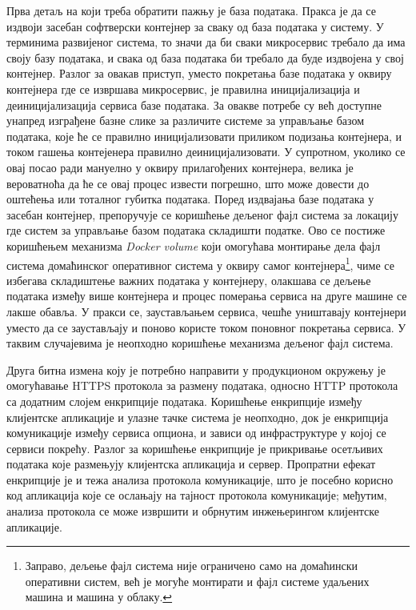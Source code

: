 \documentclass[12pt,oneside]{memoir}
\begin{document}
Прва детаљ на који треба обратити пажњу је база података. Пракса је да се издвоји засебан софтверски контејнер за сваку од база података у систему. У терминима развијеног система, то значи да би сваки микросервис требало да има своју базу података, и свака од база података би требало да буде издвојена у свој контејнер. Разлог за овакав приступ, уместо покретања базе података у оквиру контејнера где се извршава микросервис, је правилна иницијализација и деиницијализација сервиса базе података. За овакве потребе су већ доступне унапред изграђене базне слике за различите системе за управљање базом података, које ће се правилно иницијализовати приликом подизања контејнера, и током гашења контејенера правилно деиницијализовати. У супротном, уколико се овај посао ради мануелно у оквиру прилагођених контејнера, велика је вероватноћа да ће се овај процес извести погрешно, што може довести до оштећења или тоталног губитка података. Поред издвајања базе података у засебан контејнер, препоручује се коришћење дељеног фајл система за локацију где систем за управљање базом података складишти податке. Ово се постиже коришћењем механизма \textit{Docker volume} \cite{dockervolume} који омогућава монтирање дела фајл система домаћинског оперативног система у оквиру самог контејнера\footnote{Заправо, дељење фајл система није ограничено само на домаћински оперативни систем, већ је могуће монтирати и фајл системе удаљених машина и машина у облаку.}, чиме се избегава складиштење важних података у контејнеру, олакшава се дељење података између више контејнера и процес померања сервиса на друге машине се лакше обавља. У пракси се, заустављањем сервиса, чешће уништавају контејнери уместо да се заустављају и поново користе током поновног покретања сервиса. У таквим случајевима је неопходно коришћење механизма дељеног фајл система.

Друга битна измена коју је потребно направити у продукционом окружењу је омогућавање HTTPS протокола за размену података, односно HTTP протокола са додатним слојем енкрипције података. Коришћење енкрипције између клијентске апликације и улазне тачке система је неопходно, док је енкрипција комуникације између сервиса опциона, и зависи од инфраструктуре у којој се сервиси покрећу. Разлог за коришћење енкрипције је прикривање осетљивих података које размењују клијентска апликација и сервер. Пропратни ефекат енкрипције је и тежа анализа протокола комуникације, што је посебно корисно код апликација које се ослањају на тајност протокола комуникације; међутим, анализа протокола се може извршити и обрнутим инжењерингом клијентске апликације.
\end{document}
